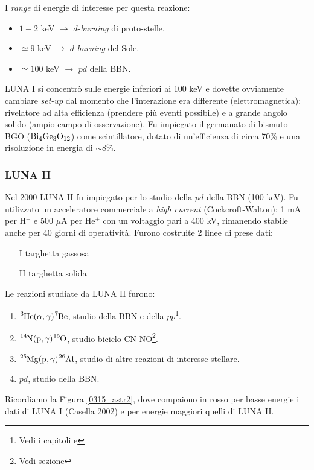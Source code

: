I \textit{range} di energie di interesse per questa reazione:
\begin{itemize}
	\item $1-2$ keV $\to$ $d$-\textit{burning} di proto-stelle.
	\item $\simeq 9$ keV $\to$ $d$-\textit{burning} del Sole.
	\item $\simeq 100$ keV $\to$ $pd$ della BBN.
\end{itemize}
LUNA I si concentrò sulle energie inferiori ai 100 keV e dovette ovviamente cambiare \textit{set-up} dal momento che l'interazione era differente (elettromagnetica): rivelatore ad alta efficienza (prendere più eventi possibile) e a grande angolo solido (ampio campo di osservazione). Fu impiegato il germanato di bismuto BGO%
 ($\ce{Bi_4}\ce{Ge_3}\ce{O_{12}}$) come scintillatore, dotato di un'efficienza di circa 70\% e una risoluzione in energia di $\sim 8\%$.


\subsubsection{LUNA II}\label{sec-LUNAII}
Nel 2000 LUNA II fu impiegato per lo studio della $pd$ della BBN (100 keV). Fu utilizzato un acceleratore commerciale a \textit{high current} (Cockcroft-Walton): 1 mA per H$^+$ e 500 $\mu$A per He$^+$ con un voltaggio pari a 400 kV, rimanendo stabile anche per 40 giorni di operatività. Furono costruite 2 linee di prese dati:
\begin{enumerate}
	\item[I] targhetta gassosa
	\item[II] targhetta solida
\end{enumerate}
Le reazioni studiate da LUNA II furono:
\begin{enumerate}
	\item $\ce{^3He(\alpha,\gamma)\ce{^7Be}}$, studio della BBN e della $pp$\footnote{Vedi i capitoli  e }.
	\item $\ce{^{14}N(p,\gamma)^{15}O}$, studio biciclo CN-NO\footnote{Vedi sezione }.
	\item $\ce{^{25}Mg(p,\gamma)^{26}Al}$, studio di altre reazioni di interesse stellare.
	\item $pd$, studio della BBN.
\end{enumerate}
Ricordiamo la Figura \ref{0315_astr2}, dove compaiono in rosso per basse energie i dati di LUNA I (Casella 2002) e per energie maggiori quelli di LUNA II.

